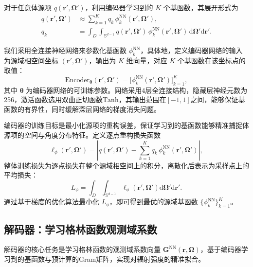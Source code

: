 对于任意体源项 $q(\boldsymbol{r}',\boldsymbol{\Omega}')$，利用编码器学习到的 $K$ 个基函数，其展开形式为
\begin{equation}
    \begin{aligned}
        q(\boldsymbol{r}',\boldsymbol{\Omega}') & \approx \sum_{k=1}^{K} q_k\, \phi_k^{\text{NN}}(\boldsymbol{r}',\boldsymbol{\Omega}'),                                                                                                         \\
        q_k                                     & = \int_{D}\int_{\mathbb{S}^{d-1}} q(\boldsymbol{r}',\boldsymbol{\Omega}')\, \phi_k^{\text{NN}}(\boldsymbol{r}',\boldsymbol{\Omega}')\,\mathrm{d}\boldsymbol{\Omega}'\mathrm{d}\boldsymbol{r}'.
    \end{aligned}
\end{equation}

我们采用全连接神经网络来参数化基函数 $\phi_k^{\text{NN}}$，具体地，定义编码器网络的输入为源域相空间坐标 $(\boldsymbol{r}',\boldsymbol{\Omega}')$，输出为 $K$ 维向量，对应 $K$ 个基函数在该坐标点的取值：
\begin{equation}
    \text{Encoder}_{\boldsymbol{\theta}}(\boldsymbol{r}',\boldsymbol{\Omega}') = \bigl[\phi_k^{\text{NN}}(\boldsymbol{r}',\boldsymbol{\Omega}')\bigr]_{k=1}^{K},
\end{equation}
其中 $\boldsymbol{\theta}$ 为编码器网络的可训练参数。网络采用4层全连接结构，隐藏层神经元数为256，激活函数选用双曲正切函数$\text{Tanh}$，其输出范围在$[-1,1]$之间，能够保证基函数的有界性，同时缓解深层网络的梯度消失问题。

编码器的训练目标是最小化源项的重构误差，保证学习到的基函数能够精准捕捉体源项的空间与角度分布特征。定义逐点重构损失函数
\begin{equation}
    \ell_\phi(\boldsymbol{r}',\boldsymbol{\Omega}') = \left| q(\boldsymbol{r}',\boldsymbol{\Omega}') - \sum_{k=1}^{K} q_k\, \phi_k^{\text{NN}}(\boldsymbol{r}',\boldsymbol{\Omega}') \right|,
\end{equation}
整体训练损失为逐点损失在整个源域相空间上的积分，离散化后表示为采样点上的平均损失：
\begin{equation}
    L_\phi = \int_{D}\int_{\mathbb{S}^{d-1}} \ell_\phi(\boldsymbol{r}',\boldsymbol{\Omega}')\mathrm{d}\boldsymbol{\Omega}'\mathrm{d}\boldsymbol{r}'.
\end{equation}
通过基于梯度的优化算法最小化 $L_\phi$，即可得到最优的源域基函数 $\{\phi_k^{\text{NN}}\}_{k=1}^K$。

\subsection{解码器：学习格林函数观测域系数}\label{sec:prte-decoder}
解码器的核心任务是学习格林函数的观测域系数向量 $\boldsymbol{G}^{\text{NN}}(\boldsymbol{r},\boldsymbol{\Omega})$，基于编码器学习到的基函数与预计算的Gram矩阵，实现对辐射强度的精准拟合。

